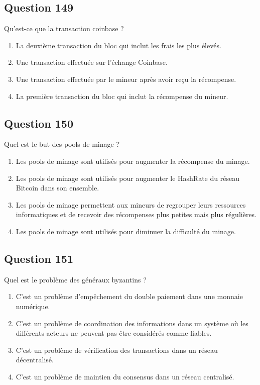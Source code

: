 \documentclass[12pt,a4paper]{article}
\begin{document}
\bigskip


\subsection*{Question 149}
Qu'est-ce que la transaction coinbase ?

\begin{enumerate}[label=\Alph*., leftmargin=*]
\item La deuxième transaction du bloc qui inclut les frais les plus élevés.
\item Une transaction effectuée sur l'échange Coinbase.
\item Une transaction effectuée par le mineur après avoir reçu la récompense.
\item La première transaction du bloc qui inclut la récompense du mineur.
\end{enumerate}

\bigskip


\subsection*{Question 150}
Quel est le but des pools de minage ?

\begin{enumerate}[label=\Alph*., leftmargin=*]
\item Les pools de minage sont utilisés pour augmenter la récompense du minage.
\item Les pools de minage sont utilisés pour augmenter le HashRate du réseau Bitcoin dans son ensemble.
\item Les pools de minage permettent aux mineurs de regrouper leurs ressources informatiques et de recevoir des récompenses plus petites mais plus régulières.
\item Les pools de minage sont utilisés pour diminuer la difficulté du minage.
\end{enumerate}

\bigskip


\subsection*{Question 151}
Quel est le problème des généraux byzantins ?

\begin{enumerate}[label=\Alph*., leftmargin=*]
\item C'est un problème d'empêchement du double paiement dans une monnaie numérique.
\item C'est un problème de coordination des informations dans un système où les différents acteurs ne peuvent pas être considérés comme fiables.
\item C'est un problème de vérification des transactions dans un réseau décentralisé.
\item C'est un problème de maintien du consensus dans un réseau centralisé.
\end{enumerate}
\end{document}
